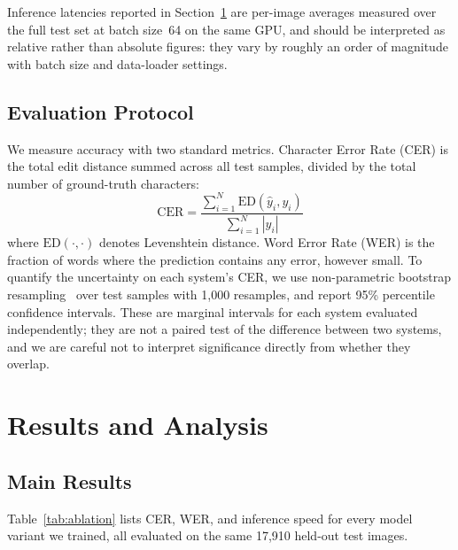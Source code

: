 \documentclass[pdflatex,sn-mathphys-num]{sn-jnl}
\begin{document}
Inference latencies reported in Section~\ref{sec:results} are per-image averages measured over the full test set at batch size~64 on the same GPU, and should be interpreted as relative rather than absolute figures: they vary by roughly an order of magnitude with batch size and data-loader settings.

\subsection{Evaluation Protocol}\label{sec:exp:eval}

We measure accuracy with two standard metrics. Character Error Rate (CER) is the total edit distance summed across all test samples, divided by the total number of ground-truth characters:
\begin{equation}
    \text{CER} = \frac{\sum_{i=1}^{N} \text{ED}(\hat{y}_i, y_i)}{\sum_{i=1}^{N} |y_i|}
\end{equation}
where $\text{ED}(\cdot, \cdot)$ denotes Levenshtein distance. Word Error Rate (WER) is the fraction of words where the prediction contains any error, however small. To quantify the uncertainty on each system's CER, we use non-parametric bootstrap resampling~\cite{efron1993bootstrap} over test samples with 1,000 resamples, and report 95\% percentile confidence intervals. These are marginal intervals for each system evaluated independently; they are not a paired test of the difference between two systems, and we are careful not to interpret significance directly from whether they overlap.

\section{Results and Analysis}\label{sec:results}

\subsection{Main Results}\label{sec:results:main}

Table~\ref{tab:ablation} lists CER, WER, and inference speed for every model variant we trained, all evaluated on the same 17,910 held-out test images.
\end{document}
